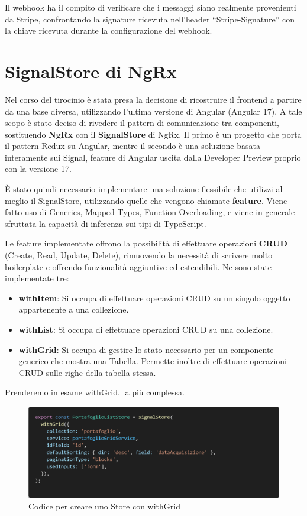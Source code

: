 Il webhook ha il compito di verificare che i messaggi siano realmente provenienti da Stripe, confrontando la signature ricevuta nell'header ``Stripe-Signature'' con la
chiave ricevuta durante la configurazione del webhook.

\section{SignalStore di NgRx}
Nel corso del tirocinio \`e stata presa la decisione di ricostruire il frontend a partire da una base diversa, utilizzando l'ultima versione di Angular (Angular 17).
A tale scopo \`e stato deciso di rivedere il pattern di comunicazione tra componenti, sostituendo \textbf{NgRx} con il \textbf{SignalStore} di NgRx.
Il primo \`e un progetto che porta il pattern Redux su Angular, mentre il secondo \`e una soluzione basata interamente sui Signal, feature di Angular uscita dalla
Developer Preview proprio con la versione 17.

\`E stato quindi necessario implementare una soluzione flessibile che utilizzi al meglio il SignalStore, utilizzando quelle che vengono chiamate \textbf{feature}.
Viene fatto uso di Generics, Mapped Types, Function Overloading, e viene in generale sfruttata la capacit\`a di inferenza sui tipi di TypeScript.

Le feature implementate offrono la possibilit\`a di effettuare operazioni \textbf{CRUD} (Create, Read, Update, Delete), rimuovendo la necessit\`a di scrivere molto boilerplate e offrendo
funzionalit\`a aggiuntive ed estendibili.
\newpage
Ne sono state implementate tre:
\begin{itemize}
  \item \textbf{withItem}: Si occupa di effettuare operazioni CRUD su un singolo oggetto appartenente a una collezione.
  \item \textbf{withList}: Si occupa di effettuare operazioni CRUD su una collezione.
  \item \textbf{withGrid}: Si occupa di gestire lo stato necessario per un componente generico che mostra una Tabella. Permette inoltre di effettuare operazioni CRUD sulle righe
    della tabella stessa.
\end{itemize}

Prenderemo in esame withGrid, la pi\`u complessa.
\\
\begin{figure}[H]
  \centering
  \includegraphics[width=12cm]{images/code-store.png}
  \caption{Codice per creare uno Store con withGrid}
\end{figure}

